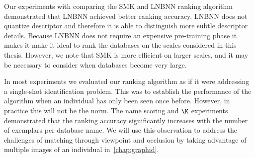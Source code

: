         Our experiments with comparing the SMK and LNBNN ranking algorithm demonstrated that LNBNN achieved
          better ranking accuracy.
        LNBNN does not quantize descriptor and therefore it is able to distinguish more subtle descriptor
          details.
        Because LNBNN does not require an expensive pre-training phase it makes it make it ideal to rank the
          databases on the scales considered in this thesis.
        However, we note that SMK is more efficient on larger scales, and it may be necessary to consider when
          databases become very large.

        In most experiments we evaluated our ranking algorithm as if it were addressing a single-shot
          identification problem.
        This was to establish the performance of the algorithm when an individual has only been seen once
          before.
        However, in practice this will not be the norm.
        The name scoring and $\K$ experiments demonstrated that the ranking accuracy significantly increases
          with the number of exemplars per database name.
        We will use this observation to address the challenges of matching through viewpoint and occlusion by
          taking advantage of multiple images of an individual in~\cref{chap:graphid}.


